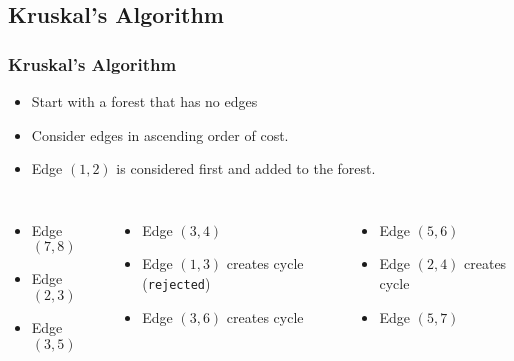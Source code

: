 \documentclass[newPxFont,sthlmFooter,nooffset]{beamer}
\begin{document}
\subsection{Kruskal's Algorithm}
\begin{frame}[t]
  \frametitle{Kruskal's Algorithm}
\begin{itemize}
  \item Start with a forest that has no edges
  \item  Consider edges in ascending order of cost.
  \item<2-> Edge $(1,2)$ is considered first and added to the forest.
\end{itemize}

{\footnotesize
\begin{columns}
    \begin{itemize}
\item<3-> Edge $(7,8)$
\item<6-> Edge $(2,3)$
\item<9-> Edge $(3,5)$
    \end{itemize}

    \begin{itemize}
\item<4-> Edge $(3,4)$
\item<7-> Edge $(1,3)$ creates cycle (\texttt{rejected})
\item<10-> Edge $(3,6)$  creates cycle
    \end{itemize}    

    \begin{itemize}
\item<5-> Edge $(5,6)$
\item<8-> Edge $(2,4)$  creates cycle
\item<11-> Edge $(5,7)$
    \end{itemize}    
\end{columns}}

\begin{columns}
  \begin{column}{0.5\textwidth}
\begin{center}
\end{center}
\end{column}
\end{columns}
\end{frame}
\end{document}
